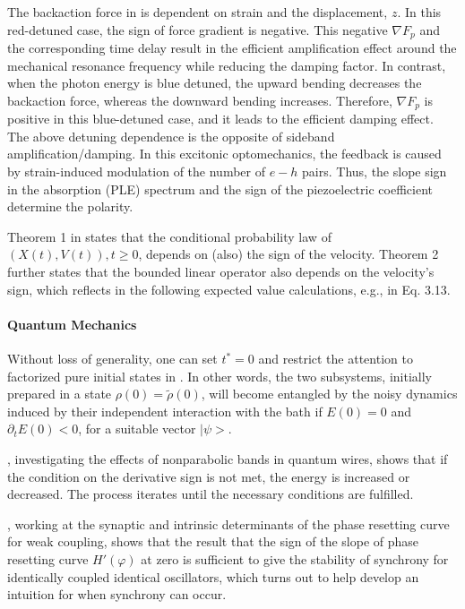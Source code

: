 \documentclass[11pt]{book}
\begin{document}
The backaction force in \cite{okamoto2015cavity} is dependent on
strain and the displacement, $z$. In this red-detuned case, the sign
of force gradient is negative. This negative $\nabla F_{p}$ and the
corresponding time delay result in the efficient amplification effect
around the mechanical resonance frequency while reducing the damping
factor. In contrast, when the photon energy is blue detuned, the upward
bending decreases the backaction force, whereas the downward bending
increases. Therefore, $\nabla F_{p}$ is positive in this blue-detuned
case, and it leads to the efficient damping effect. The above detuning
dependence is the opposite of sideband amplification/damping. In this
excitonic optomechanics, the feedback is caused by strain-induced
modulation of the number of $e-h$ pairs. Thus, the slope sign in
the absorption (PLE) spectrum and the sign of the piezoelectric coefficient
determine the polarity.

Theorem 1 in \cite{de2021telegraph} states that the conditional probability
law of $\left(X\left(t\right),V\left(t\right)\right),t\geq0$, depends
on (also) the sign of the velocity. Theorem 2 further states that
the bounded linear operator also depends on the velocity's sign, which
reflects in the following expected value calculations, e.g., in Eq.
3.13.


\paragraph{Quantum Mechanics}

Without loss of generality, one can set $t^{\ast}=0$ and restrict
the attention to factorized pure initial states in \cite{benatti2003environment}.
In other words, the two subsystems, initially prepared in a state
$\rho(0)=\tilde{\rho}(0)$, will become entangled by the noisy dynamics
induced by their independent interaction with the bath if $E(0)=0$
and $\partial_{t}E(0)<0$, for a suitable vector $|\psi>$.

\cite{godoy2005effects}, investigating the effects of nonparabolic bands in quantum wires, shows that if the condition on the derivative sign is not met, the energy is increased or decreased. The process iterates
until the necessary conditions are fulfilled.

\cite{achuthan2011synaptic}, working at the synaptic and intrinsic
determinants of the phase resetting curve for weak coupling, shows that the result that the sign of
the slope of phase resetting curve $H'\left(\varphi\right)$ at zero
is sufficient to give the stability of synchrony for identically coupled
identical oscillators, which turns out to help develop an intuition
for when synchrony can occur.
\end{document}
